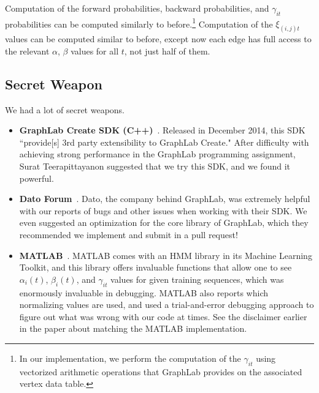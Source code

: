 Computation of the forward probabilities, backward probabilities, and $\gamma_{it}$ probabilities can be computed similarly to before.\footnote{In our implementation, we perform the computation of the $\gamma_{it}$ using vectorized arithmetic operations that GraphLab provides on the associated vertex data table.}  Computation of the $\xi_{(i, j)t}$ values can be computed similar to before, except now each edge has full access to the relevant $\alpha$, $\beta$ values for all $t$, not just half of them.

\subsection{Secret Weapon}

We had a lot of secret weapons. 

\begin{itemize}
    \item \textbf{GraphLab Create SDK (C++)}~\cite{graphlab-create}.  Released in December 2014, this SDK ``provide[s] 3rd party extensibility to GraphLab Create."  After difficulty with achieving strong performance in the GraphLab programming assignment, Surat Teerapittayanon suggested that we try this SDK, and we found it powerful.

    \item \textbf{Dato Forum}~\cite{datoforum}.  Dato, the company behind GraphLab, was extremely helpful with our reports of bugs and other issues when working with their SDK.  We even suggested an optimization for the core library of GraphLab, which they recommended we implement and submit in a pull request!

\item \textbf{MATLAB}~\cite{matlab}.  MATLAB comes with an HMM library in its Machine Learning Toolkit, and this library offers invaluable functions that allow one to see $\alpha_i(t)$, $\beta_i(t)$,  and $\gamma_{it}$ values for given training sequences, which was enormously invaluable in debugging.  MATLAB also reports which normalizing values are used, and used a trial-and-error debugging approach to figure out what was wrong with our code at times.  See the disclaimer earlier in the paper about matching the MATLAB implementation. 
\end{itemize}
